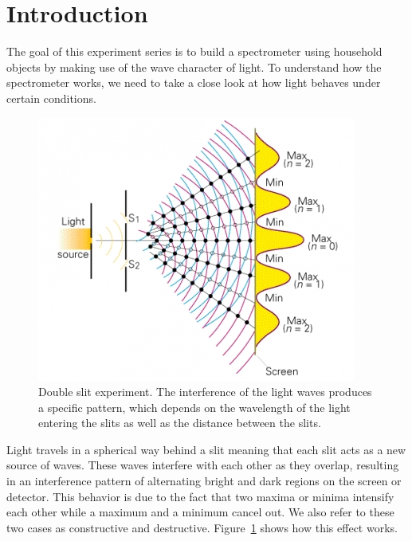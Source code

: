 \section{Introduction}


    The goal of this experiment series is to build a spectrometer using household objects by making use of the wave character of light.
    To understand how the spectrometer works, we need to take a close look at how light behaves under certain conditions.

    \begin{figure}[H]
        \centering
        \includegraphics[scale = 0.7]{src/images/interference_double_slit.jpg}
        \caption{Double slit experiment.
        The interference of the light waves produces a specific pattern, which depends on the wavelength of the light entering the slits as well as the distance between the slits. \cite{src_double_slit}}
        \label{fig_double_slit}
    \end{figure}

    Light travels in a spherical way behind a slit meaning that each slit acts as a new source of waves.
    These waves interfere with each other as they overlap, resulting in an interference pattern of alternating bright and dark regions on the screen or detector.
    This behavior is due to the fact that two maxima or minima intensify each other while a maximum and a minimum cancel out.
    We also refer to these two cases as constructive and destructive.
    Figure~\ref{fig_double_slit} shows how this effect works.

